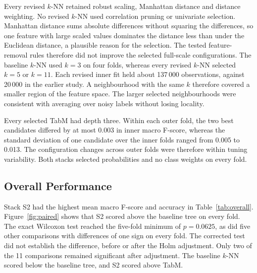 \documentclass[conference]{IEEEtran}
\newcommand{\knn}{\mbox{$k$-NN}}
\begin{document}
Every revised \knn{} retained robust scaling, Manhattan distance and distance weighting. No revised \knn{} used correlation pruning or univariate selection. Manhattan distance sums absolute differences without squaring the differences, so one feature with large scaled values dominates the distance less than under the Euclidean distance, a plausible reason for the selection. The tested feature-removal rules therefore did not improve the selected full-scale configurations. The baseline \knn{} used $k=3$ on four folds, whereas every revised \knn{} selected $k=5$ or $k=11$. Each revised inner fit held about 137\,000 observations, against 20\,000 in the earlier study. A neighbourhood with the same $k$ therefore covered a smaller region of the feature space. The larger selected neighbourhoods were consistent with averaging over noisy labels without losing locality.

Every selected TabM had depth three. Within each outer fold, the two best candidates differed by at most 0.003 in inner macro F-score, whereas the standard deviation of one candidate over the inner folds ranged from 0.005 to 0.013. The configuration changes across outer folds were therefore within tuning variability. Both stacks selected probabilities and no class weights on every fold.

\subsection{Overall Performance}
Stack S2 had the highest mean macro F-score and accuracy in Table~\ref{tab:overall}. Figure~\ref{fig:paired} shows that S2 scored above the baseline tree on every fold. The exact Wilcoxon test reached the five-fold minimum of $p=0.0625$, as did five other comparisons with differences of one sign on every fold. The corrected test did not establish the difference, before or after the Holm adjustment. Only two of the 11 comparisons remained significant after adjustment. The baseline \knn{} scored below the baseline tree, and S2 scored above TabM.
\end{document}
